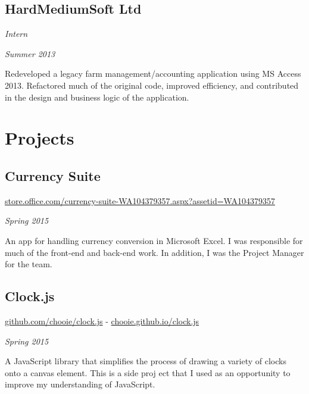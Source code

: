 \subsection*{HardMediumSoft Ltd}
\begin{minipage}[b]{0.5\textwidth}
  \flushleft
  \emph{Intern}
\end{minipage}
\begin{minipage}[b]{0.5\textwidth}
  \flushright
  \emph{Summer 2013}
\end{minipage}
Redeveloped a legacy farm management/accounting application using MS Access 2013. Refactored much of the original code, improved efficiency, and contributed in the design and business logic of the application.

\section*{Projects}
\subsection*{Currency Suite}
\begin{minipage}[b]{0.8\textwidth}
  \flushleft
  \href{https://store.office.com/currency-suite-WA104379357.aspx?assetid=WA104379357}{store.office.com/currency-suite-WA104379357.aspx?assetid=WA104379357}
\end{minipage}
\begin{minipage}[b]{0.2\textwidth}
  \flushright
  \emph{Spring 2015}
\end{minipage}
An app for handling currency conversion in Microsoft  Excel. I was responsible for much of the front-end and back-end work. In addition, I was the Project Manager for the team.

\subsection*{Clock.js}
\begin{minipage}[b]{0.5\textwidth}
  \flushleft
  \href{https://github.com/chooie/clock.js}{github.com/chooie/clock.js} - \href {https://chooie.github.io/clock.js}{chooie.github.io/clock.js}
\end{minipage}
\begin{minipage}[b]{0.5\textwidth}
  \flushright
  \emph{Spring 2015}
\end{minipage}
A JavaScript library that simplifies the process of drawing a variety of clocks onto a canvas element. This is a side proj
ect that I used as an opportunity to improve my understanding of JavaScript.


